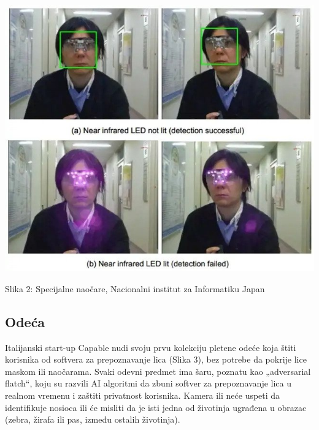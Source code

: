 \documentclass{article}
\begin{document}
\begin{center}
\begin{minipage}{0.5\textwidth}
\includegraphics[width=\textwidth]{naocare.jpg}
\end{minipage}

\vspace{0.5cm}

Slika 2: Specijalne naočare, Nacionalni institut za Informatiku Japan
\end{center}


\subsection{Odeća}
Italijanski start-up Capable nudi svoju prvu kolekciju pletene odeće koja štiti korisnika od softvera za prepoznavanje lica (Slika 3), bez potrebe da pokrije lice maskom ili naočarama. Svaki odevni predmet ima šaru, poznatu kao „adversarial flatch“, koju su razvili AI algoritmi da zbuni softver za prepoznavanje lica u realnom vremenu i zaštiti privatnost korisnika. Kamera ili neće uspeti da identifikuje nosioca ili će misliti da je isti jedna od životinja ugrađena u obrazac (zebra, žirafa ili pas, između ostalih životinja). \cite{peta}
\end{document}
